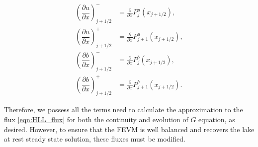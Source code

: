 \begin{subequations}
	\begin{align}
	\left(\dfrac{\partial {u}}{\partial x} \right)^-_{j + 1/2} &= \frac{\partial }{\partial x}P^u_j(x_{j+1/2}),  \\
	\left(\dfrac{\partial {u}}{\partial x} \right)^+_{j + 1/2} &= \frac{\partial }{\partial x}P^u_{j+1}(x_{j+1/2}),  \\
	\left(\dfrac{\partial {b}}{\partial x} \right)^-_{j + 1/2} &= \frac{\partial }{\partial x}P^b_j(x_{j+1/2}), \\
	\left(\dfrac{\partial {b}}{\partial x} \right)^+_{j + 1/2} &= \frac{\partial }{\partial x}P^b_{j+1}(x_{j+1/2}). 	\end{align}
	\label{eqn:dbduRecon}
\end{subequations}

Therefore, we possess all the terms need to calculate the approximation to the flux \eqref{eqn:HLL_flux} for both the continuity and evolution of $G$ equation, as desired. However, to ensure that the FEVM is well balanced and recovers the lake at rest steady state solution, these fluxes must be modified.

